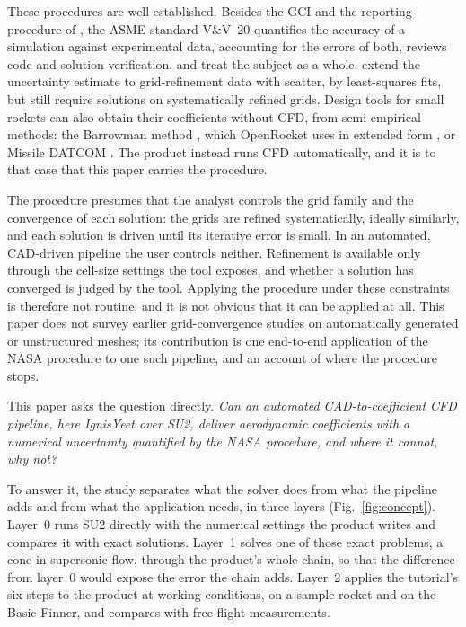 \documentclass[twocolumn]{labreport}
\begin{document}
These procedures are well established.
Besides the GCI and the reporting procedure of \citet{celik2008}, the ASME standard V\&V~20 \citep{asme2009} quantifies the accuracy of a simulation against experimental data, accounting for the errors of both, \citet{roy2005} reviews code and solution verification, and \citet{oberkampf2010} treat the subject as a whole.
\citet{eca2014} extend the uncertainty estimate to grid-refinement data with scatter, by least-squares fits, but still require solutions on systematically refined grids.
Design tools for small rockets can also obtain their coefficients without CFD, from semi-empirical methods: the Barrowman method \citep{barrowman1967}, which OpenRocket uses in extended form \citep{niskanen2009}, or Missile DATCOM \citep{blake1998}.
The product instead runs CFD automatically, and it is to that case that this paper carries the procedure.

The procedure presumes that the analyst controls the grid family and the convergence of each solution: the grids are refined systematically, ideally similarly, and each solution is driven until its iterative error is small.
In an automated, CAD-driven pipeline the user controls neither.
Refinement is available only through the cell-size settings the tool exposes, and whether a solution has converged is judged by the tool.
Applying the procedure under these constraints is therefore not routine, and it is not obvious that it can be applied at all.
This paper does not survey earlier grid-convergence studies on automatically generated or unstructured meshes; its contribution is one end-to-end application of the NASA procedure to one such pipeline, and an account of where the procedure stops.

This paper asks the question directly.
\emph{Can an automated CAD-to-coefficient CFD pipeline, here IgnisYeet over SU2, deliver aerodynamic coefficients with a numerical uncertainty quantified by the NASA procedure, and where it cannot, why not?}

To answer it, the study separates what the solver does from what the pipeline adds and from what the application needs, in three layers (Fig.~\ref{fig:concept}).
Layer~0 runs SU2 directly with the numerical settings the product writes and compares it with exact solutions.
Layer~1 solves one of those exact problems, a cone in supersonic flow, through the product's whole chain, so that the difference from layer~0 would expose the error the chain adds.
Layer~2 applies the tutorial's six steps to the product at working conditions, on a sample rocket and on the Basic Finner, and compares with free-flight measurements.
\end{document}
